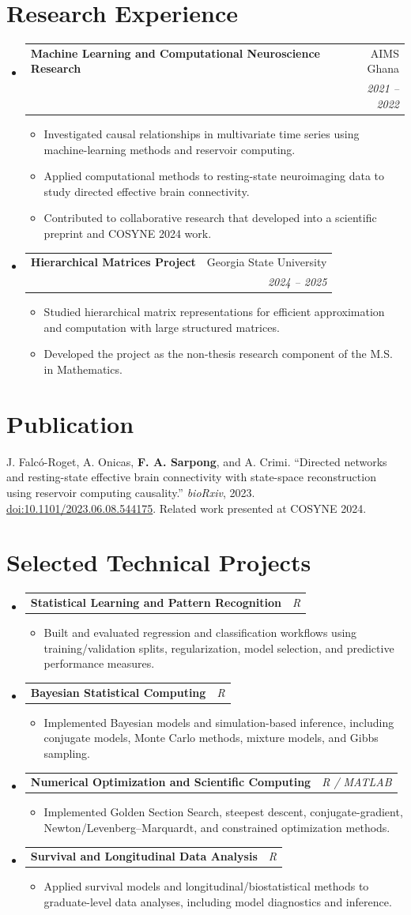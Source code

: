 \documentclass[a4paper,11pt]{article}
\makeatletter
\newcommand{\resumeItem}[1]{\item\small{#1}}
\newcommand{\resumeItemListStart}{\begin{itemize}[leftmargin=0.22in,rightmargin=0.08in,itemsep=1pt,topsep=2pt,parsep=0pt]}
\newcommand{\resumeItemListEnd}{\end{itemize}\vspace{-2pt}}
\newcommand{\resumeQuadHeading}[4]{\item\begin{tabular*}{0.96\textwidth}[t]{l@{\extracolsep{\fill}}r}\textbf{#1} & #2 \\\textit{\small #3} & \textit{\small #4} \\\end{tabular*}\vspace{-2pt}}
\newcommand{\resumeProjectHeading}[2]{\item\begin{tabular*}{0.96\textwidth}[t]{l@{\extracolsep{\fill}}r}\textbf{#1} & \textit{\small #2}\\\end{tabular*}\vspace{-3pt}}
\newcommand{\resumeHeadingListStart}{\begin{itemize}[leftmargin=0.15in,label={},itemsep=2pt,topsep=2pt]}
\newcommand{\resumeHeadingListEnd}{\end{itemize}\vspace{-2pt}}
\makeatother
\begin{document}
\section{Research Experience}
\resumeHeadingListStart
  \resumeQuadHeading{Machine Learning and Computational Neuroscience Research}{AIMS Ghana}{}{2021 -- 2022}
  \resumeItemListStart
    \resumeItem{Investigated causal relationships in multivariate time series using machine-learning methods and reservoir computing.}
    \resumeItem{Applied computational methods to resting-state neuroimaging data to study directed effective brain connectivity.}
    \resumeItem{Contributed to collaborative research that developed into a scientific preprint and COSYNE 2024 work.}
  \resumeItemListEnd
  \resumeQuadHeading{Hierarchical Matrices Project}{Georgia State University}{}{2024 -- 2025}
  \resumeItemListStart
    \resumeItem{Studied hierarchical matrix representations for efficient approximation and computation with large structured matrices.}
    \resumeItem{Developed the project as the non-thesis research component of the M.S. in Mathematics.}
  \resumeItemListEnd
\resumeHeadingListEnd

\section{Publication}
\small{J. Falc\'o-Roget, A. Onicas, \textbf{F. A. Sarpong}, and A. Crimi. ``Directed networks and resting-state effective brain connectivity with state-space reconstruction using reservoir computing causality.'' \textit{bioRxiv}, 2023. \href{https://doi.org/10.1101/2023.06.08.544175}{\uline{doi:10.1101/2023.06.08.544175}}. Related work presented at COSYNE 2024.}

\section{Selected Technical Projects}
\resumeHeadingListStart
  \resumeProjectHeading{Statistical Learning and Pattern Recognition}{R}
  \resumeItemListStart
    \resumeItem{Built and evaluated regression and classification workflows using training/validation splits, regularization, model selection, and predictive performance measures.}
  \resumeItemListEnd
  \resumeProjectHeading{Bayesian Statistical Computing}{R}
  \resumeItemListStart
    \resumeItem{Implemented Bayesian models and simulation-based inference, including conjugate models, Monte Carlo methods, mixture models, and Gibbs sampling.}
  \resumeItemListEnd
  \resumeProjectHeading{Numerical Optimization and Scientific Computing}{R / MATLAB}
  \resumeItemListStart
    \resumeItem{Implemented Golden Section Search, steepest descent, conjugate-gradient, Newton/Levenberg--Marquardt, and constrained optimization methods.}
  \resumeItemListEnd
  \resumeProjectHeading{Survival and Longitudinal Data Analysis}{R}
  \resumeItemListStart
    \resumeItem{Applied survival models and longitudinal/biostatistical methods to graduate-level data analyses, including model diagnostics and inference.}
  \resumeItemListEnd
\resumeHeadingListEnd
\end{document}
